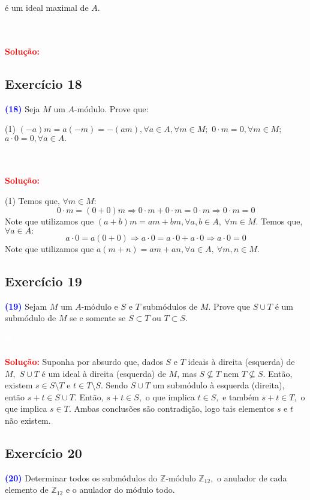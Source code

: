 \documentclass[11pt,a4paper]{article}
\newcommand{\exercicio}[1]{\subsection{Exercício #1} \textcolor{blue}{\bf(#1)}}
\newcommand{\dividiritens}[1]{\begin{tasks}[counter-format={(tsk[a])},label-width=3.6ex, label-format = {\bfseries}, column-sep = {0pt}](1) #1 \end{tasks}}
\newcommand{\pers}[1]{\textcolor{Floresta}{$\negrito{(#1)} $}}
\newcommand{\solucao}[1]{
\textbf{\textcolor{white}{oi}\\ \\ \textcolor{red}{Solução:}} #1}
\begin{document}
é um ideal maximal de $A.$ 
\solucao{}
\exercicio{18} Seja $M$ um $A$-módulo. Prove que:
\dividiritens{
\task[\pers{a}] $(-a)m = a(-m) = -(am), \forall a \in A, \forall m \in M;$
\task[\pers{b}] $0 \cdot m = 0, \forall m \in M;$
\task[\pers{c}] $a \cdot 0 = 0, \forall a \in A.$
}
\solucao{
\dividiritens{
\task[\pers{a}] %
\task[\pers{b}] Temos que, $\forall m \in M:$
\[
0 \cdot m = (0+0)m \Rightarrow 0 \cdot m + 0 \cdot m = 0 \cdot m \Rightarrow 0 \cdot m = 0
\]
Note que utilizamos que $(a+b)m = am + bm, \forall a,b \in A, \ \forall m \in M.$
\task[\pers{c}] Temos que, $\forall a \in A:$
\[
a \cdot 0 = a(0+0) \Rightarrow a \cdot 0 = a \cdot 0 + a \cdot 0  \Rightarrow a \cdot 0 = 0
\]
Note que utilizamos que $a(m+n) = am + an, \forall a \in A, \ \forall m,n \in M.$
}
}
\exercicio{19}  Sejam $M$ um $A$-módulo e $S$ e $T$ submódulos de $M.$ Prove que $S \cup T$ é um submódulo de $M$ se e somente se $S \subset T$ ou $T \subset S.$ 
\solucao{Suponha por absurdo que, dados $S$ e $T$ ideais à direita (esquerda) de $M,$ $S \cup T$ é um ideal à direita (esquerda) de $M$, mas $S \nsubseteq T$ nem $T \nsubseteq S.$ Então, existem $s \in S \setminus T$ e $t \in T \setminus S.$ Sendo $S \cup T$ um submódulo à esquerda (direita), então $s+t \in S \cup T.$ Então, $s+t \in S,$ o que implica $t \in S,$ e também $s+t \in T,$ o que implica $s \in T.$ Ambas conclusões são contradição, logo tais elementos $s$ e $t$ não existem.}
\exercicio{20} Determinar todos os submódulos do $\mathbb{Z}$-módulo $\mathbb{Z}_{12},$ o anulador de cada elemento de $\mathbb{Z}_{12}$ e o anulador do módulo todo.
\end{document}
